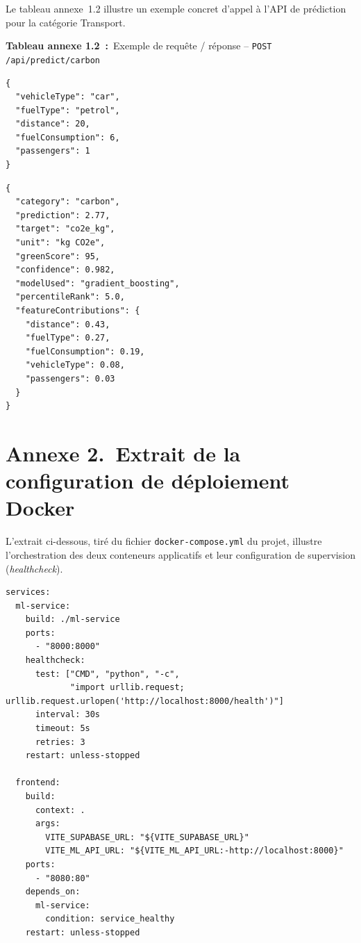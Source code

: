 
Le tableau annexe~1.2 illustre un exemple concret d'appel à l'API de prédiction pour la catégorie Transport.

{\raggedright \textbf{Tableau annexe 1.2~:}~Exemple de requête / réponse -- \texttt{POST /api/predict/carbon}}

\begin{lstlisting}[caption={Corps de la requête (JSON)}]
{
  "vehicleType": "car",
  "fuelType": "petrol",
  "distance": 20,
  "fuelConsumption": 6,
  "passengers": 1
}
\end{lstlisting}

\begin{lstlisting}[caption={Réponse renvoyée (JSON)}]
{
  "category": "carbon",
  "prediction": 2.77,
  "target": "co2e_kg",
  "unit": "kg CO2e",
  "greenScore": 95,
  "confidence": 0.982,
  "modelUsed": "gradient_boosting",
  "percentileRank": 5.0,
  "featureContributions": {
    "distance": 0.43,
    "fuelType": 0.27,
    "fuelConsumption": 0.19,
    "vehicleType": 0.08,
    "passengers": 0.03
  }
}
\end{lstlisting}

\newpage
\section*{Annexe 2.~Extrait de la configuration de déploiement Docker}

L'extrait ci-dessous, tiré du fichier \texttt{docker-compose.yml} du projet, illustre l'orchestration des deux conteneurs applicatifs et leur configuration de supervision (\textit{healthcheck}).

\begin{lstlisting}[caption={Extrait de docker-compose.yml}]
services:
  ml-service:
    build: ./ml-service
    ports:
      - "8000:8000"
    healthcheck:
      test: ["CMD", "python", "-c",
             "import urllib.request; urllib.request.urlopen('http://localhost:8000/health')"]
      interval: 30s
      timeout: 5s
      retries: 3
    restart: unless-stopped

  frontend:
    build:
      context: .
      args:
        VITE_SUPABASE_URL: "${VITE_SUPABASE_URL}"
        VITE_ML_API_URL: "${VITE_ML_API_URL:-http://localhost:8000}"
    ports:
      - "8080:80"
    depends_on:
      ml-service:
        condition: service_healthy
    restart: unless-stopped
\end{lstlisting}

